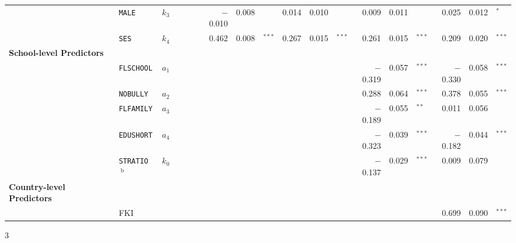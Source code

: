 {\begin{tabular}{l @{\hskip -3.5cm} l c rr @{\hskip -0.1mm}l rr @{\hskip -0.1mm}l rr @{\hskip -0.1mm}l rr @{\hskip -0.1mm}l rr @{\hskip -0.1mm}l}
            & \texttt{MALE}  & $k_3$ &       &       &       & $-$0.010 & 0.008 &       & 0.014 & 0.010 &       & 0.009 & 0.011 &       & 0.025 & 0.012 & $^*$ \\
            & \texttt{SES}   & $k_4$ &       &       &       & 0.462 & 0.008 & $^{***}$ & 0.267 & 0.015 & $^{***}$   & 0.261 & 0.015 & $^{***}$   & 0.209 & 0.020 & $^{***}$ \\
      \textbf{School-level Predictors} &&       &       &       &       &       &       &       &       &       &       &       &       &       &       &       &  \\
            & \texttt{FLSCHOOL} & $a_1$ &       &       &       &       &       &       &       &       &       & $-$0.319 & 0.057 & $^{***}$ & $-$0.330 & 0.058 & $^{***}$ \\
            & \texttt{NOBULLY} & $a_2$ &       &       &       &       &       &       &       &       &       & 0.288 & 0.064 & $^{***}$ & 0.378 & 0.055 & $^{***}$ \\
            & \texttt{FLFAMILY} & $a_3$ &       &       &       &       &       &       &       &       &       & $-$0.189 & 0.055 & $^{**}$ & 0.011 & 0.056 &  \\
            & \texttt{EDUSHORT} & $a_4$ &       &       &       &       &       &       &       &       &       & $-$0.323 & 0.039 & $^{***}$ & $-$0.182 & 0.044 & $^{***}$ \\
            & \texttt{STRATIO}$\ ^\text{b}$ & $k_0$ &       &       &       &       &       &       &       &       &       & $-$0.137 & 0.029 & $^{***}$ & 0.009 & 0.079 &  \\
      \textbf{Country-level Predictors} &&       &       &       &       &       &       &       &       &       &       &       &       &       &       &       &  \\
            & FKI   &&       &       &       &       &       &       &       &       &       &       &       &       & 0.699 & 0.090 & $^{***}$ \\
      \end{tabular}
}{3}
